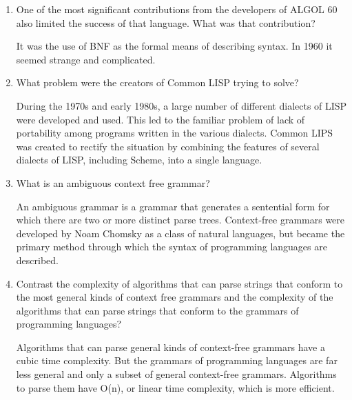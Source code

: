 \begin{enumerate}
\begin{answer}
    \end{answer}


  \item One of the most significant contributions from the developers
    of ALGOL 60 also limited the success of that language. What was
    that contribution?

  \begin{answer}

    It was the use of BNF as the formal means of describing syntax. In 1960 it seemed strange and complicated.

    \end{answer}

  \item What problem were the creators of Common LISP trying to solve?

  \begin{answer}

    During the 1970s and early 1980s, a large number of different dialects of LISP were developed and used. This led to the familiar problem of lack of portability among programs written in the various dialects. Common LIPS was created to rectify the situation by combining the features of several dialects of LISP, including Scheme, into a single language.

    \end{answer}

  \item What is an ambiguous context free grammar?

  \begin{answer}

    An ambiguous grammar is a grammar that generates a sentential form for which there are two or more distinct parse trees. Context-free grammars were developed by Noam Chomsky as a class of natural languages, but became the primary method through which the syntax of programming languages are described. 

    \end{answer}

  \item Contrast the complexity of algorithms that can parse strings
    that conform to the most general kinds of context free grammars
    and the complexity of the algorithms that can parse strings that
    conform to the grammars of programming languages?

  \begin{answer}

Algorithms that can parse general kinds of context-free grammars have a cubic time complexity. But the grammars of programming languages are far less general and only a subset of general context-free grammars. Algorithms to parse them have O(n), or linear time complexity, which is more efficient.    


\end{answer}
\end{enumerate}
